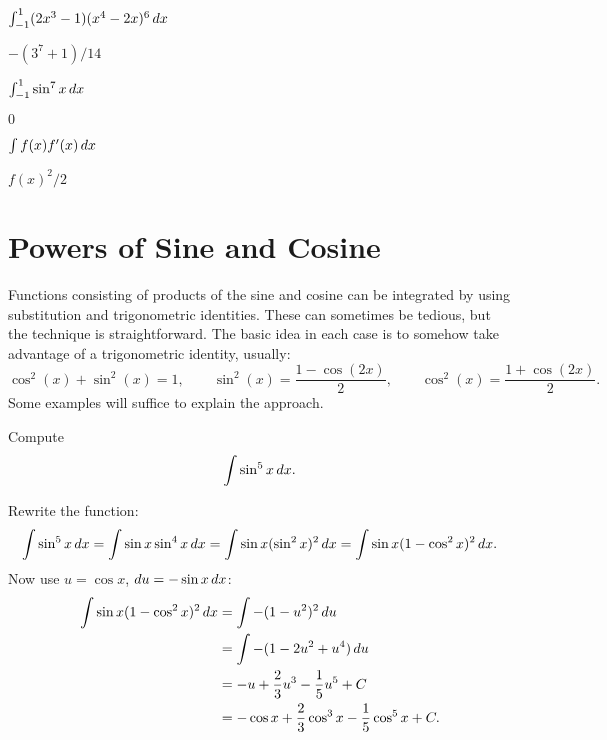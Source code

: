 \begin{exercises}
\begin{exercise} $\int_{-1}^1 (2x^3-1)(x^4-2x)^6\, d x$
\begin{answer} $-(3^7+1)/14$
\end{answer}\end{exercise}

\begin{exercise} $\int_{-1}^1 \sin^7 x\, d x$
\begin{answer} $0$
\end{answer}\end{exercise}

\begin{exercise} $\int f(x) f'(x)\, d x$ 
\begin{answer} $f(x)^2/2$
\end{answer}\end{exercise}

\endtwocol

\end{exercises}










\section{Powers of Sine and Cosine}


Functions consisting of products of the sine and cosine can be
integrated by using substitution and trigonometric identities. These
can sometimes be tedious, but the technique is straightforward. The
basic idea in each case is to somehow take advantage of a
trigonometric identity, usually:
\[
\cos^2(x) + \sin^2(x) = 1, \qquad \sin^2(x) = \frac{1-\cos(2x)}{2}, \qquad \cos^2(x)= \frac{1+\cos(2x)}{2}.
\]
Some examples will suffice to explain the approach.

\begin{example}
Compute
\[\int \sin^5 x\, d x.
\]
\end{example}

\begin{solution}
Rewrite the function:
$$
  \int \sin^5 x\, d x=\int \sin x \sin^4 x\, d x=
  \int \sin x (\sin^2 x)^2\, d x=
  \int \sin x (1-\cos^2 x)^2\, d x.
$$
Now use $u=\cos x$, $du=-\sin x\, d x$:
\begin{align*}
  \int \sin x (1-\cos^2 x)^2\, d x&=\int -(1-u^2)^2\, d u \\
  &=\int -(1-2u^2+u^4)\, d u \\
  &=-u+{2\over3}u^3-{1\over5}u^5+C \\
  &=-\cos x+{2\over3}\cos^3 x-{1\over5}\cos^5x+C. 
\end{align*}
\end{solution}

